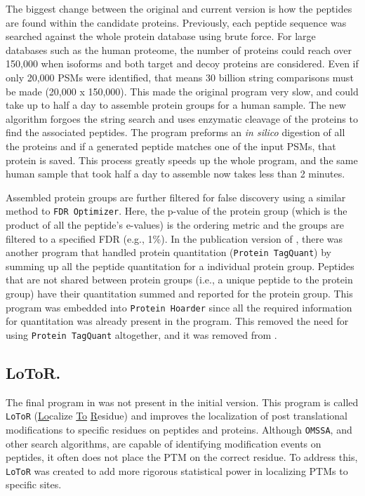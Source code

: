 The biggest change between the original and current version is how the peptides are found within the candidate proteins. Previously, each peptide sequence was searched against the whole protein database using brute force. For large databases such as the human proteome, the number of proteins could reach over 150,000 when isoforms and both target and decoy proteins are considered. Even if only 20,000 PSMs were identified, that means 30 billion string comparisons must be made (20,000 x 150,000). This made the original program very slow, and could take up to half a day to assemble protein groups for a human sample. The new algorithm forgoes the string search and uses enzymatic cleavage of the proteins to find the associated peptides. The program preforms an \emph{in silico} digestion of all the proteins and if a generated peptide matches one of the input PSMs, that protein is saved. This process greatly speeds up the whole program, and the same human sample that took half a day to assemble now takes less than 2 minutes. 

Assembled protein groups are further filtered for false discovery using a similar method to \texttt{FDR Optimizer}. Here, the p-value of the protein group (which is the product of all the peptide's e-values) is the ordering metric and the groups are filtered to a specified FDR (e.g., 1\%). In the publication version of \compass{}, there was another program that handled protein quantitation (\texttt{Protein TagQuant}) by summing up all the peptide quantitation for a individual protein group. Peptides that are not shared between protein groups (i.e., a unique peptide to the protein group) have their quantitation summed and reported for the protein group. This program was embedded into \texttt{Protein Hoarder} since all the required information for quantitation was already present in the program. This removed the need for using \texttt{Protein TagQuant} altogether, and it was removed from \compass{}. 

\subsection*{LoToR.}
The final program in \compass{} was not present in the initial version. This program is called \texttt{LoToR} (\underline{Lo}calize \underline{To} \underline{R}esidue) and improves the localization of post translational modifications to specific residues on peptides and proteins. Although \texttt{OMSSA}, and other search algorithms, are capable of identifying modification events on peptides, it often does not place the PTM on the correct residue. To address this, \texttt{LoToR} was created to add more rigorous statistical power in localizing PTMs to specific sites. 

